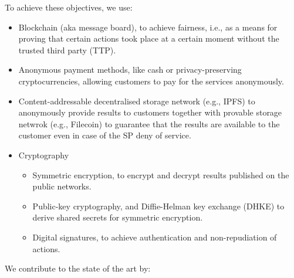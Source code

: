 \documentclass{ieeeaccess}
\begin{document}
To achieve these objectives, we use:
\begin{itemize}
    \item Blockchain (aka message board), to achieve fairness, i.e., as a means for proving that certain actions took place at a certain moment without the trusted third party (TTP).
    \item Anonymous payment methods, like cash or privacy-preserving cryptocurrencies, allowing customers to pay for the services anonymously.
    \item Content-addressable decentralised storage network (e.g., IPFS) to anonymously provide results to customers together with provable storage netwrok (e.g., Filecoin) to guarantee that the results are available to the customer even in case of the SP deny of service. 
    \item Cryptography
    \begin{itemize}
        \item Symmetric encryption, to encrypt and decrypt results published on the public networks.
        \item Public-key cryptography, and Diffie-Helman key exchange (DHKE) to derive shared secrets for symmetric encryption.
        \item Digital signatures, to achieve authentication and non-repudiation of actions. 
    \end{itemize}
    
\end{itemize}


We contribute to the state of the art by:
\end{document}
